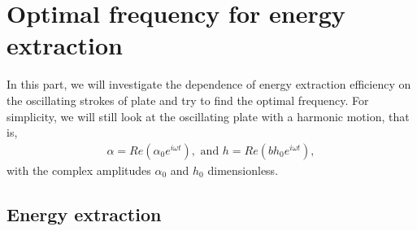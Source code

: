 \section{Optimal frequency for energy extraction}

In this part, we will investigate the dependence of energy extraction efficiency on the oscillating strokes of plate and try to find the optimal frequency.
For simplicity, we will still look at the oscillating plate with a harmonic motion, that is,
\begin{align}
\alpha = Re(\alpha_0 e^{i\omega t}),    \text{    and   }        h = Re(b h_0 e^{i\omega t}),
\end{align}
with the complex amplitudes $\alpha_0$ and $h_0$ dimensionless.

\subsection{Energy extraction}

